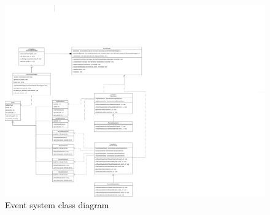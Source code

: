 \documentclass{projdoc}
\begin{document}
\begin{figure}
	\centering
	\includegraphics[width=\linewidth]{img/event-uml.drawio.png}
	\caption{Event system class diagram}
	\label{fig:event-uml}
\end{figure}
\end{document}
